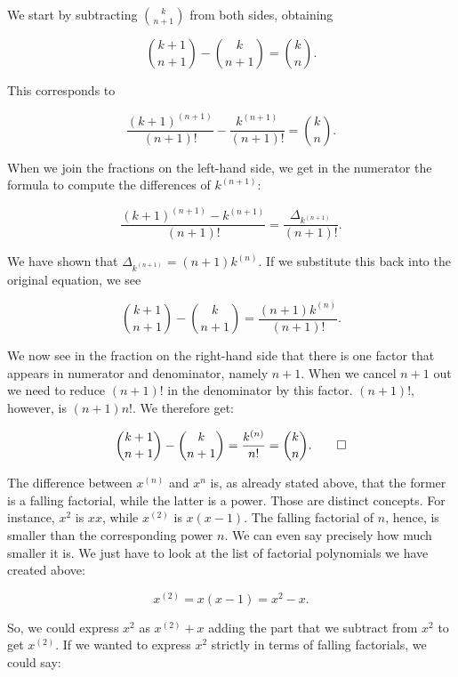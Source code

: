 \documentclass[tikz]{scrreprt}
\begin{document}
We start by subtracting $\binom{k}{n+1}$
from both sides, obtaining

\begin{equation}
\binom{k+1}{n+1} - \binom{k}{n+1} = \binom{k}{n}.
\end{equation}

This corresponds to

\begin{equation}
\frac{(k+1)^{(n+1)}}{(n+1)!} - \frac{k^{(n+1)}}{(n+1)!} = \binom{k}{n}.
\end{equation}

When we join the fractions on the left-hand side,
we get in the numerator the formula to compute 
the differences of $k^{(n+1)}$:

\[
\frac{(k+1)^{(n+1)} - k^{(n+1)}}{(n+1)!} =
\frac{\Delta_{k^{(n+1)}}}{(n+1)!}.
\]

We have shown that $\Delta_{k^{(n+1)}} = (n+1)k^{(n)}$.
If we substitute this back into the original equation,
we see

\begin{equation}
\binom{k+1}{n+1} - \binom{k}{n+1} =
\frac{(n+1){k^{(n)}}}{(n+1)!}.
\end{equation}

We now see in the fraction on the right-hand side 
that there is one factor
that appears in numerator and denominator,
namely $n+1$. When we cancel $n+1$ out
we need to
reduce $(n+1)!$ in the denominator by this factor.
$(n+1)!$, however, is $(n+1)n!$.
We therefore get:

\begin{equation}
\binom{k+1}{n+1} - \binom{k}{n+1} =
\frac{{k^{(n)}}}{n!} = 
\binom{k}{n}.\qed
\end{equation}

The difference between $x^{(n)}$ and $x^n$ is,
as already stated above, that the former is
a falling factorial, while the latter is
a power. Those are distinct concepts.
For instance, $x^2$ is $xx$, while
$x^{(2)}$ is $x(x-1)$. The falling factorial of $n$,
hence, is smaller than the corresponding power $n$.
We can even say precisely how much smaller it is.
We just have to look at the list of factorial
polynomials we have created above:

\begin{equation}
x^{(2)} = x(x-1) = x^2 - x.
\end{equation}

So, we could express $x^2$ as
$x^{(2)} + x$ adding the part that
we subtract from $x^2$ to get $x^{(2)}$.
If we wanted to express $x^2$ strictly
in terms of falling factorials, we could say: 
\end{document}
